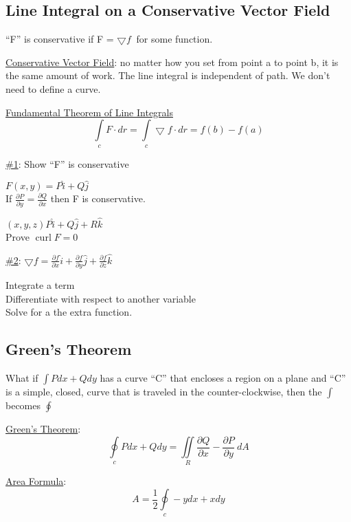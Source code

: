 \documentclass[12pt]{article}
\numberwithin{equation}{subsection}
\newcommand{\parx}[1]{\frac{\partial #1}{\partial x}}
\newcommand{\pary}[1]{\frac{\partial #1}{\partial y}}
\newcommand{\parz}[1]{\frac{\partial #1}{\partial z}}
\newcommand{\inda}{\hspace{.5cm}}
\newcommand{\indd}{\hspace{2cm}}
\DeclareMathOperator{\vcurl}{curl}
\begin{document}
\begin{flushleft}
\newpage
\subsection{Line Integral on a Conservative Vector Field}
``F'' is conservative if F = $\bigtriangledown f\ $ for some function.

\bigskip

\underline{Conservative Vector Field}: no matter how you set from point a to point b, it is the same amount of work. The line integral is independent of path. We don't need to define a curve.

\bigskip
\underline{Fundamental Theorem of Line Integrals}
\begin{equation}
\int \limits_c F \cdot dr = \int \limits_c \bigtriangledown f \cdot dr = f(b) - f(a)
\end{equation}

\inda \underline{\#1}: Show ``F'' is conservative

\bigskip 
\indd $F(x,y) = P\hat{i} + Q\hat{j}$\\
\indd If $\pary{P} = \parx{Q}$ then F is conservative.
\bigskip

\indd $(x,y,z) P\hat{i} + Q\hat{j} + R\hat{k}$\\
\indd Prove $\vcurl F = 0$
\bigskip

\inda \underline{\#2}: $\bigtriangledown f = \parx{f}\hat{i} + \pary{f}\hat{j} + \parz{f}\hat{k}$

\bigskip
\indd Integrate a term\\
\indd Differentiate with respect to another variable \\
\indd Solve for a the extra function.


\subsection{Green's Theorem}
What if $ \int Pdx + Qdy $ has a curve ``C'' that encloses a region on a plane and ``C'' is a simple, closed, curve that is traveled in the counter-clockwise, then the $\int $ becomes $\oint$

\bigskip
\underline{Green's Theorem}:
\begin{equation}
\oint \limits_c Pdx + Qdy = \iint \limits_R \parx{Q} - \pary{P}\ dA
\end{equation}

\bigskip
\underline{Area Formula}:
\begin{equation}
A = \frac{1}{2} \oint \limits_c -y dx + x dy
\end{equation}


\end{flushleft}
\end{document}
